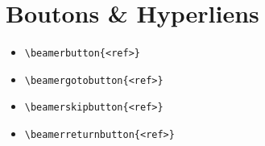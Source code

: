 \documentclass[12pt]{bristol}
\begin{document}
\section{Boutons \& Hyperliens}
\begin{itemize}
\item \verb|\beamerbutton{<ref>}|~\faChevronRight~\beamerbutton{\ref{sec:thm}}
\item \verb|\beamergotobutton{<ref>}|~\faChevronRight~\beamergotobutton{\ref{sec:thm}}
\item \verb|\beamerskipbutton{<ref>}|~\faChevronRight~\beamerskipbutton{\ref{sec:thm}}
\item \verb|\beamerreturnbutton{<ref>}|~\faChevronRight~\beamerreturnbutton{\ref{sec:thm}}
\end{itemize}
\end{document}
